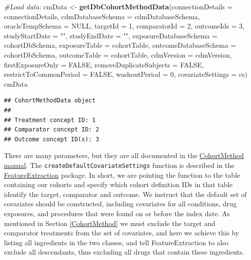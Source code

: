 \documentclass[11pt]{book}
\newenvironment{Shaded}{\begin{snugshade}}{\end{snugshade}}
\newcommand{\CommentTok}[1]{\textcolor[rgb]{0.56,0.35,0.01}{\textit{#1}}}
\newcommand{\DataTypeTok}[1]{\textcolor[rgb]{0.13,0.29,0.53}{#1}}
\newcommand{\DecValTok}[1]{\textcolor[rgb]{0.00,0.00,0.81}{#1}}
\newcommand{\KeywordTok}[1]{\textcolor[rgb]{0.13,0.29,0.53}{\textbf{#1}}}
\newcommand{\NormalTok}[1]{#1}
\newcommand{\OtherTok}[1]{\textcolor[rgb]{0.56,0.35,0.01}{#1}}
\newcommand{\StringTok}[1]{\textcolor[rgb]{0.31,0.60,0.02}{#1}}
\theoremstyle{definition}
\theoremstyle{definition}
\theoremstyle{definition}
\theoremstyle{remark}
\begin{document}
\begin{Shaded}
\begin{Highlighting}[]
\CommentTok{#Load data:}
\NormalTok{cmData <-}\StringTok{ }\KeywordTok{getDbCohortMethodData}\NormalTok{(}\DataTypeTok{connectionDetails =}\NormalTok{ connectionDetails,}
                                \DataTypeTok{cdmDatabaseSchema =}\NormalTok{ cdmDatabaseSchema,}
                                \DataTypeTok{oracleTempSchema =} \OtherTok{NULL}\NormalTok{,}
                                \DataTypeTok{targetId =} \DecValTok{1}\NormalTok{,}
                                \DataTypeTok{comparatorId =} \DecValTok{2}\NormalTok{,}
                                \DataTypeTok{outcomeIds =} \DecValTok{3}\NormalTok{,}
                                \DataTypeTok{studyStartDate =} \StringTok{""}\NormalTok{,}
                                \DataTypeTok{studyEndDate =} \StringTok{""}\NormalTok{,}
                                \DataTypeTok{exposureDatabaseSchema =}\NormalTok{ cohortDbSchema,}
                                \DataTypeTok{exposureTable =}\NormalTok{ cohortTable,}
                                \DataTypeTok{outcomeDatabaseSchema =}\NormalTok{ cohortDbSchema,}
                                \DataTypeTok{outcomeTable =}\NormalTok{ cohortTable,}
                                \DataTypeTok{cdmVersion =}\NormalTok{ cdmVersion,}
                                \DataTypeTok{firstExposureOnly =} \OtherTok{FALSE}\NormalTok{,}
                                \DataTypeTok{removeDuplicateSubjects =} \OtherTok{FALSE}\NormalTok{,}
                                \DataTypeTok{restrictToCommonPeriod =} \OtherTok{FALSE}\NormalTok{,}
                                \DataTypeTok{washoutPeriod =} \DecValTok{0}\NormalTok{,}
                                \DataTypeTok{covariateSettings =}\NormalTok{ cs)}
\NormalTok{cmData}
\end{Highlighting}
\end{Shaded}

\begin{verbatim}
## CohortMethodData object
## 
## Treatment concept ID: 1
## Comparator concept ID: 2
## Outcome concept ID(s): 3
\end{verbatim}

There are many parameters, but they are all documented in the \href{https://ohdsi.github.io/CohortMethod/reference/}{CohortMethod manual}. The \texttt{createDefaultCovariateSettings} function is described in the \href{https://ohdsi.github.io/FeatureExtraction/}{FeatureExtraction} package. In short, we are pointing the function to the table containing our cohorts and specify which cohort definition IDs in that table identify the target, comparator and outcome. We instruct that the default set of covariates should be constructed, including covariates for all conditions, drug exposures, and procedures that were found on or before the index date. As mentioned in Section \ref{CohortMethod} we must exclude the target and comparator treatments from the set of covariates, and here we achieve this by listing all ingredients in the two classes, and tell FeatureExtraction to also exclude all descendants, thus excluding all drugs that contain these ingredients.
\end{document}
